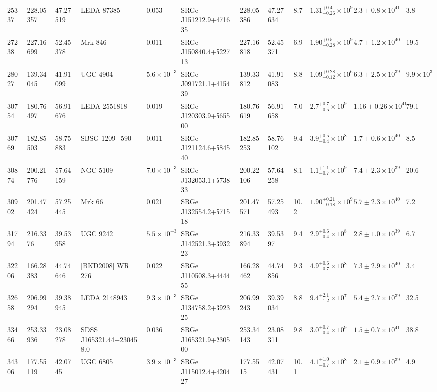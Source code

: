 \begin{longtable}{llllllllllll}
25337 & 228.05357 & 47.27519 & LEDA   87385 & 0.053 & SRGe J151212.9+471635 & 228.05386 & 47.27634 & 8.7 & $1.31^{+0.4}_{-0.26}\times10^{9}$ & $2.3\pm0.8\times10^{41}$ & 3.8 \\
27238 & 227.16699 & 52.45378 & Mrk  846 & 0.011 & SRGe J150840.4+522713 & 227.16818 & 52.45371 & 6.9 & $1.90^{+0.5}_{-0.28}\times10^{9}$ & $4.7\pm1.2\times10^{40}$ & 19.5 \\
28027 & 139.34045 & 41.91099 & UGC  4904 & $5.6\times10^{-3}$ & SRGe J091721.1+415439 & 139.33812 & 41.91083 & 8.8 & $1.09^{+0.28}_{-0.12}\times10^{6}$ & $6.3\pm2.5\times10^{39}$ & $9.9\times10^{3}$ \\
30754 & 180.76497 & 56.91676 & LEDA 2551818 & 0.019 & SRGe J120303.9+565500 & 180.76619 & 56.91658 & 7.0 & $2.7^{+0.7}_{-0.5}\times10^{9}$ & $1.16\pm0.26\times10^{41}$ & 79.1 \\
30769 & 182.85503 & 58.75883 & SBSG 1209+590 & 0.011 & SRGe J121124.6+584540 & 182.85253 & 58.76102 & 9.4 & $3.9^{+0.5}_{-0.4}\times10^{8}$ & $1.7\pm0.6\times10^{40}$ & 8.5 \\
30874 & 200.21776 & 57.64159 & NGC  5109 & $7.0\times10^{-3}$ & SRGe J132053.1+573833 & 200.22106 & 57.64258 & 8.1 & $1.1^{+1.1}_{-0.7}\times10^{9}$ & $7.4\pm2.3\times10^{39}$ & 20.6 \\
30902 & 201.47424 & 57.25445 & Mrk   66 & 0.021 & SRGe J132554.2+571518 & 201.47571 & 57.25493 & 10.2 & $1.90^{+0.21}_{-0.18}\times10^{9}$ & $5.7\pm2.3\times10^{40}$ & 7.2 \\
31794 & 216.3376 & 39.53958 & UGC  9242 & $5.5\times10^{-3}$ & SRGe J142521.3+393223 & 216.33894 & 39.5397 & 9.4 & $2.9^{+0.6}_{-0.4}\times10^{8}$ & $2.8\pm1.0\times10^{39}$ & 6.7 \\
32206 & 166.28383 & 44.74646 & [BKD2008] WR 276 & 0.022 & SRGe J110508.3+444455 & 166.28462 & 44.74856 & 9.3 & $4.9^{+0.6}_{-0.7}\times10^{8}$ & $7.3\pm2.9\times10^{40}$ & 3.4 \\
32658 & 206.99294 & 39.38945 & LEDA 2148943 & $9.3\times10^{-3}$ & SRGe J134758.2+392325 & 206.99243 & 39.39034 & 8.8 & $9.4^{+2.1}_{-1.2}\times10^{7}$ & $5.4\pm2.7\times10^{39}$ & 32.5 \\
33466 & 253.33936 & 23.08278 & SDSS J165321.44+230458.0 & 0.036 & SRGe J165321.9+230500 & 253.34143 & 23.08311 & 9.8 & $3.0^{+0.7}_{-0.4}\times10^{9}$ & $1.5\pm0.7\times10^{41}$ & 38.8 \\
34306 & 177.55119 & 42.0745 & UGC  6805 & $3.9\times10^{-3}$ & SRGe J115012.4+420427 & 177.5515 & 42.07431 & 10.1 & $4.1^{+1.0}_{-0.7}\times10^{8}$ & $2.1\pm0.9\times10^{39}$ & 4.9 \\

\end{longtable}
